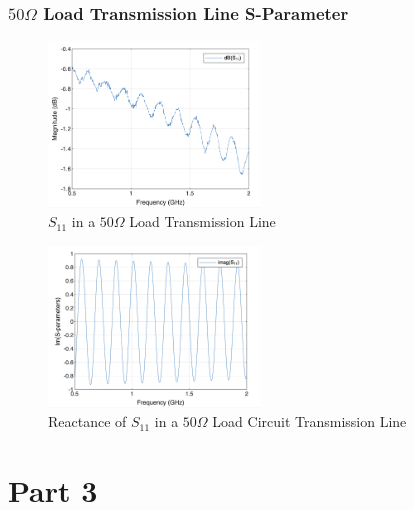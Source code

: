 \documentclass{article} %
\begin{document}
\subsubsection*{$50 \Omega$ Load Transmission Line S-Parameter}
\begin{figure}[H]
    \centering
    \includegraphics[width=0.5\textwidth]{./image/figure8.png}
    \caption{$S_{11}$ in a $50 \Omega$ Load Transmission Line}
\end{figure}
\begin{figure}[H]
    \centering
    \includegraphics[width=0.5\textwidth]{./image/figure9.png}
    \caption{Reactance of $S_{11}$ in a $50 \Omega$ Load Circuit Transmission Line}
\end{figure}

\section*{Part 3}
\end{document}
